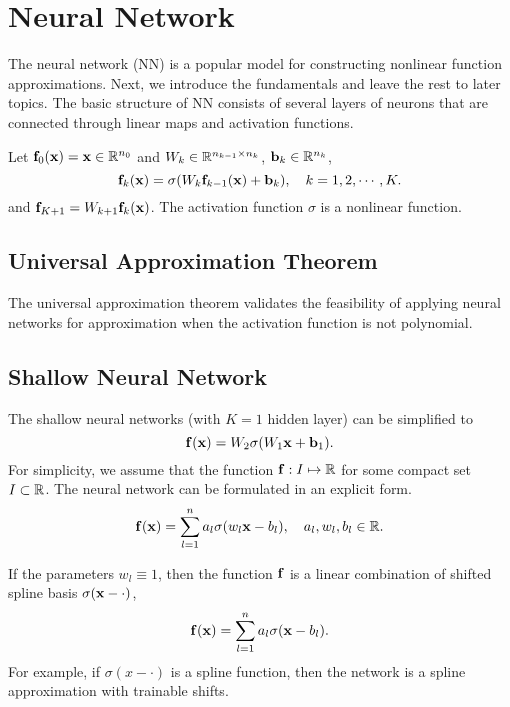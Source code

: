 \section{Neural Network}
The neural network (NN) is a popular model for constructing nonlinear function approximations. Next, we introduce the fundamentals and leave the rest to later topics. The basic structure of NN consists of several layers of neurons that are connected through linear maps and activation functions. 

\begin{example}
Let $\mathbf f_0(\mathbf x) = \mathbf x\in \mathbb R^{n_0}$ and $W_k\in \mathbb R^{n_{k-1}\times n_k}$, $\mathbf b_k \in \mathbb R^{n_k}$, 
\begin{equation}
    \mathbf f_k(\mathbf x) = \sigma(W_k \mathbf f_{k-1}(\mathbf x) + \mathbf b_k) , \quad k=1, 2,\cdots, K.
\end{equation}
and
$\mathbf f_{K+1} = W_{k+1} \mathbf f_k(\mathbf x)$. 
The activation function $\sigma$ is a nonlinear function. 
\end{example}
\subsection{Universal Approximation Theorem}
The universal approximation theorem validates the feasibility of applying neural networks for approximation when the activation function is not polynomial. 
\subsection{Shallow Neural Network}
The shallow neural networks (with $K=1$ hidden layer) can be simplified to 
\begin{equation}
    \mathbf f(\mathbf x) = W_{2}\sigma(W_1 \mathbf x + \mathbf b_1).
\end{equation}
For simplicity, we assume that the function $\mathbf f: I\mapsto \mathbb R$ for some compact set $I\subset \mathbb R$. The neural network can be formulated in an explicit form. 
\begin{equation}
    \mathbf f(\mathbf x) = \sum_{l=1}^n a_l \sigma(w_l \mathbf x - b_l),\quad a_l, w_l, b_l\in\mathbb R.
\end{equation}
\begin{example}
    If the parameters $w_l\equiv 1$, then the function $\mathbf f$ is a linear combination of shifted spline basis $\sigma(\mathbf x -\cdot)$, 
    \begin{equation}
     \mathbf f(\mathbf x) = \sum_{l=1}^n a_l \sigma(\mathbf x - b_l).
    \end{equation}
    For example, if $\sigma(x - \cdot)$ is a spline function, then the network is a spline approximation with trainable shifts.
\end{example}

